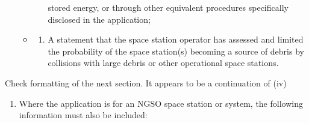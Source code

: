 \documentclass[
  letterpaper,
  DIV=11,
  numbers=noendperiod]{scrreport}
\providecommand{\tightlist}{%
  \setlength{\itemsep}{0pt}\setlength{\parskip}{0pt}}\usepackage{longtable,booktabs,array}
\begin{document}
\begin{itemize}
\begin{itemize}
\begin{enumerate}
      stored energy, or through other equivalent procedures specifically
      disclosed in the application;
    \end{enumerate}
  \item
    \begin{enumerate}
    \def\labelenumi{(\roman{enumi})}
    \setcounter{enumi}{3}
    \tightlist
    \item
      A statement that the space station operator has assessed and
      limited the probability of the space station(s) becoming a source
      of debris by collisions with large debris or other operational
      space stations.
    \end{enumerate}
  \end{itemize}
\end{itemize}

Check formatting of the next section. It appears to be a continuation of
(iv)

\begin{enumerate}
\def\labelenumi{(\Alph{enumi})}
\tightlist
\item
  Where the application is for an NGSO space station or system, the
  following information must also be included:
\end{enumerate}
\end{document}
